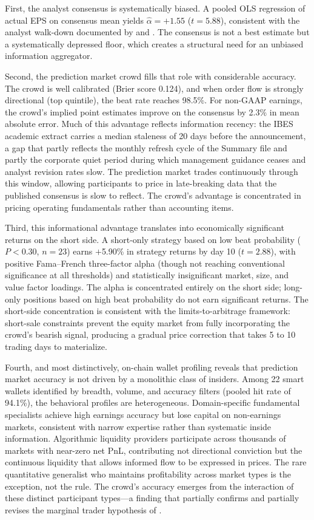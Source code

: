 \documentclass[11pt]{article}
\begin{document}
First, the analyst consensus is systematically biased. A pooled OLS regression of actual EPS on consensus mean yields $\hat{\alpha} = +1.55$ ($t = 5.88$), consistent with the analyst walk-down documented by \citet{richardson2004walk} and \citet{matsumoto2002management}. The consensus is not a best estimate but a systematically depressed floor, which creates a structural need for an unbiased information aggregator.

Second, the prediction market crowd fills that role with considerable accuracy. The crowd is well calibrated (Brier score 0.124), and when order flow is strongly directional (top quintile), the beat rate reaches 98.5\%. For non-GAAP earnings, the crowd's implied point estimates improve on the consensus by 2.3\% in mean absolute error. Much of this advantage reflects information recency: the IBES academic extract carries a median staleness of 20 days before the announcement, a gap that partly reflects the monthly refresh cycle of the Summary file and partly the corporate quiet period during which management guidance ceases and analyst revision rates slow. The prediction market trades continuously through this window, allowing participants to price in late-breaking data that the published consensus is slow to reflect. The crowd's advantage is concentrated in pricing operating fundamentals rather than accounting items.

Third, this informational advantage translates into economically significant returns on the short side. A short-only strategy based on low beat probability ($P < 0.30$, $n = 23$) earns $+$5.90\% in strategy returns by day 10 ($t = 2.88$), with positive Fama--French three-factor alpha (though not reaching conventional significance at all thresholds) and statistically insignificant market, size, and value factor loadings. The alpha is concentrated entirely on the short side; long-only positions based on high beat probability do not earn significant returns. The short-side concentration is consistent with the limits-to-arbitrage framework: short-sale constraints prevent the equity market from fully incorporating the crowd's bearish signal, producing a gradual price correction that takes 5 to 10 trading days to materialize.

Fourth, and most distinctively, on-chain wallet profiling reveals that prediction market accuracy is not driven by a monolithic class of insiders. Among 22 smart wallets identified by breadth, volume, and accuracy filters (pooled hit rate of 94.1\%), the behavioral profiles are heterogeneous. Domain-specific fundamental specialists achieve high earnings accuracy but lose capital on non-earnings markets, consistent with narrow expertise rather than systematic inside information. Algorithmic liquidity providers participate across thousands of markets with near-zero net PnL, contributing not directional conviction but the continuous liquidity that allows informed flow to be expressed in prices. The rare quantitative generalist who maintains profitability across market types is the exception, not the rule. The crowd's accuracy emerges from the interaction of these distinct participant types---a finding that partially confirms and partially revises the marginal trader hypothesis of \citet{forsythe1992anatomy}.
\end{document}
